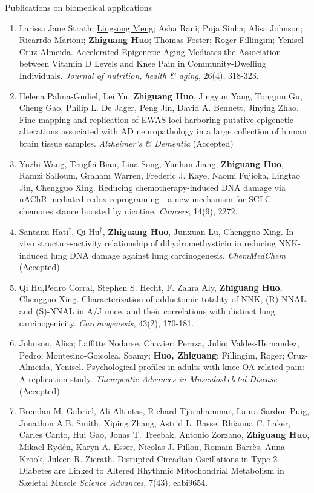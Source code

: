 \documentclass{resume} %
\begin{document}
\begin{rSection}{Publications on biomedical applications}
\begin{enumerate}[noitemsep,topsep=0pt, resume]
\item
Larissa Jane Strath; \underline{Lingsong Meng}; Asha Rani; Puja Sinha; Alisa Johnson; Ricarrdo Marioni; {\bf Zhiguang Huo}; Thomas Foster; Roger Fillingim; Yenisel Cruz-Almeida. 
Accelerated Epigenetic Aging Mediates the Association between Vitamin D Levels and Knee Pain in Community-Dwelling Individuals. 
\emph{Journal of nutrition, health \& aging}, 26(4), 318-323.

\item
Helena Palma-Gudiel, Lei Yu, {\bf Zhiguang Huo}, Jingyun Yang, Tongjun Gu, Cheng Gao, Philip L. De Jager, Peng Jin, David A. Bennett, Jinying Zhao.
Fine-mapping and replication of EWAS loci harboring putative epigenetic alterations associated with AD neuropathology in a large collection of human brain tissue samples. \emph{Alzheimer's \& Dementia} (Accepted)

\item
Yuzhi Wang, Tengfei Bian, Lina Song, Yunhan Jiang, {\bf Zhiguang Huo}, Ramzi Salloum, Graham Warren, Frederic J. Kaye, Naomi Fujioka, Lingtao Jin, Chengguo Xing.
Reducing chemotherapy-induced DNA damage via nAChR-mediated redox reprograming - a new mechanism for SCLC chemoresistance boosted by nicotine.
\emph{Cancers}, 14(9), 2272.

\item
Santanu Hati$^\dagger$, Qi Hu$^\dagger$, {\bf Zhiguang Huo}, Junxuan Lu, Chengguo Xing. 
In vivo structure-activity relationship of dihydromethysticin in reducing NNK-induced lung DNA damage against lung carcinogenesis.
\emph{ChemMedChem} (Accepted)

\item
Qi Hu,Pedro Corral, Stephen S. Hecht, F. Zahra Aly,  {\bf Zhiguang Huo}, Chengguo Xing.
Characterization of adductomic totality of NNK, (R)-NNAL, and (S)-NNAL in A/J mice, and their correlations with distinct lung carcinogenicity. 
\emph{Carcinogenesis}, 43(2), 170-181.

\item
Johnson, Alisa; Laffitte Nodarse, Chavier; Peraza, Julio; Valdes-Hernandez, Pedro; Montesino-Goicolea, Soamy; {\bf Huo, Zhiguang}; Fillingim, Roger; Cruz-Almeida, Yenisel. 
Psychological profiles in adults with knee OA-related pain: A replication study.
\emph{Therapeutic Advances in Musculoskeletal Disease} (Accepted)

\item  
Brendan M. Gabriel, Ali Altintas, Richard Tjörnhammar, Laura Sardon-Puig, Jonathon A.B. Smith, Xiping Zhang, Astrid L. Basse, Rhianna C. Laker, Carles Canto, Hui Gao, Jonas T. Treebak, Antonio Zorzano, {\bf Zhiguang Huo}, Mikael Rydén, Karyn A. Esser, Nicolas J. Pillon, Romain Barrès, Anna Krook, Juleen R. Zierath. 
Disrupted Circadian Oscillations in Type 2 Diabetes are Linked to Altered Rhythmic Mitochondrial Metabolism in Skeletal Muscle
\emph{Science Advances}, 7(43), eabi9654.


\end{enumerate}
\end{rSection}
\end{document}
